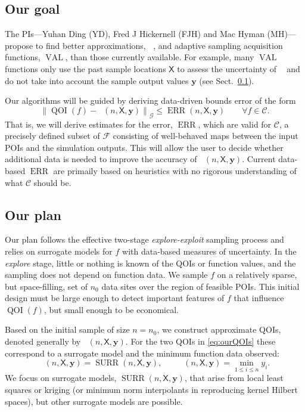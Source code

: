 \documentclass[11pt]{NSFamsart}
\DeclareMathOperator{\QOI}{QOI}
\DeclareMathOperator{\APP}{\widehat{\QOI}}
\DeclareMathOperator{\SURR}{SURR}
\DeclareMathOperator{\ERR}{ERR}
\DeclareMathOperator{\VAL}{VAL}
\DeclareMathOperator{\MIN}{MIN}
\DeclareMathOperator{\ID}{ID}
\DeclareMathOperator{\APPMIN}{\widehat{\MIN}}
\DeclareMathOperator{\APPID}{\widehat{\ID}}
\newcommand{\mX}{\mathsf{X}}
\newcommand{\by}{{\boldsymbol{y}}}
\newcommand{\calc}{{\mathcal{C}}}
\newcommand{\calf}{{\mathcal{F}}}
\newcommand{\calg}{{\mathcal{G}}}
\newcommand{\bignorm}[2][{}]{\ensuremath{\bigl \lVert #2 \bigr \rVert}_{#1}}
\begin{document}
\subsection{Our goal}

The PIs---Yuhan Ding (YD), Fred J Hickernell (FJH) and Mac Hyman (MH)---propose to find better approximations, $\APP$, and adaptive sampling acquisition functions, $\VAL$, than those currently available.  For example, many $\VAL$ functions only use the past sample locations $\mX$ to assess the uncertainty of $\APP$ and do not take into account the sample output values $\by$ (see Sect.\ \ref{}).

Our algorithms will be guided by deriving data-driven bounds error of the form 
\begin{equation} \label{eq:errbd}
    \bignorm[\calg]{\QOI(f) - \APP(n,\mX,\by)} \le \ERR(n,\mX,\by) \qquad \forall f \in \calc.
\end{equation}
That is, we will derive estimates for the error, $\ERR$, which are valid for $\calc$, a precisely defined subset of $\calf$ consisting of well-behaved maps between the input POIs and the simulation outputs. This will allow the user to decide whether additional data is needed to improve the accuracy of $\APP(n,\mX,\by)$.  Current data-based $\ERR$ are primaily based on heuristics with no rigorous understanding of what $\calc$ should be. 

\subsection{Our plan} \label{sec:OurPlan}

Our plan follows the effective two-stage \emph{explore-exploit} sampling process and relies on surrogate models for $f$ with data-based measures of uncertainty.  In the \emph{explore} stage, little or nothing is known of the QOIs or function values, and the sampling does not depend on function data.  We sample $f$ on a relatively sparse, but space-filling, set of $n_0$ data sites over the region of feasible POIs.  This initial design must be large enough to detect important features of $f$ that influence $\QOI(f)$, but small enough to be economical. 

Based on the initial sample of size $n=n_0$, we construct approximate QOIs, denoted generally by  $\APP(n,\mX,\by)$.  For the two QOIs in \eqref{eq:ourQOIs} these correspond to a surrogate model and the minimum function data observed:
\begin{equation} \label{eq:QOIhat}
    \APPID(n,\mX,\by) = \SURR(n,\mX,\by), \qquad \APPMIN(n,\mX,\by) = \min_{1 \le i \le n} y_i.
\end{equation}
We focus on surrogate models, $\SURR(n,\mX,\by)$, that arise from local least squares  or kriging (or minimum norm interpolants in reproducing kernel Hilbert spaces), but other surrogate models are possible.
\end{document}
